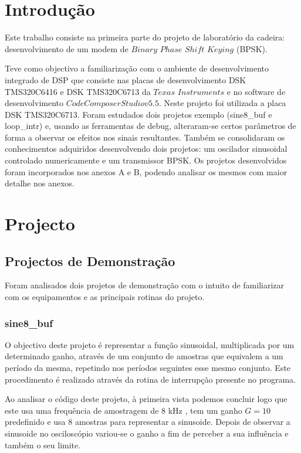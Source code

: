 \documentclass[11pt]{article}
\numberwithin{equation}{section}
\begin{document}
\section{Introdução}
Este trabalho consiste na primeira parte do projeto de laboratório da cadeira: desenvolvimento de um modem de $Binary$ $Phase$ $Shift$ $Keying$ (BPSK). 

Teve como objectivo a familiarização com o ambiente de desenvolvimento integrado de DSP que consiste nas placas de desenvolvimento DSK TMS320C6416 e DSK TMS320C6713 da $Texas$ $Instruments$ e no software de desenvolvimento $Code Composer Studio v5.5$. Neste projeto foi utilizada a placa DSK TMS320C6713. Foram estudados dois projetos exemplo (sine8\_buf e loop\_intr) e, usando as ferramentas de debug, alteraram-se certos parâmetros de forma a observar os efeitos nos sinais resultantes. Também se consolidaram os conhecimentos adquiridos desenvolvendo dois projetos: um oscilador sinusoidal controlado numericamente e um transmissor BPSK. Os projetos desenvolvidos foram incorporados nos anexos A e B, podendo analisar os mesmos com maior detalhe nos anexos.

\section{Projecto}

\subsection{Projectos de Demonstração}
Foram analisados dois projetos de demonstração com o intuito de familiarizar com os equipamentos e as principais rotinas do projeto.

\subsubsection{sine8\_buf}
\label{sec:sine8}
O objectivo deste projeto é representar a função sinusoidal, multiplicada por um determinado ganho, através de um conjunto de amostras que equivalem a um período da mesma, repetindo nos períodos seguintes esse mesmo conjunto. Este procedimento é realizado através da rotina de interrupção presente no programa. 

Ao analisar o código deste projeto, à primeira vista podemos concluir logo que este usa uma frequência de amostragem de 8 kHz , tem um ganho $G=10$ predefinido e usa 8 amostras para representar a sinusoide. Depois de observar a sinusoide no osciloscópio variou-se o ganho a fim de perceber a sua influência e também o seu limite.
 
\end{document}
